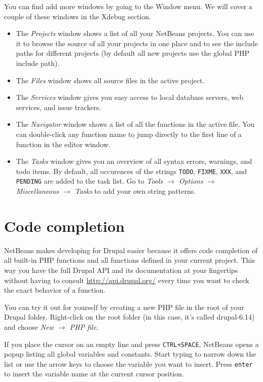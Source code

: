 \documentclass[draft,ebook,10pt,twoside,openright]{memoir}
\begin{document}
You can find add more windows by going to the Window menu. We will cover a couple of these windows in the Xdebug section.

\begin{itemize}
\item The \emph{Projects} window shows a list of all your NetBeans projects. You can use it to browse the source of all your projects in one place and to see the include paths for different projects (by default all new projects use the global PHP include path).
\item The \emph{Files} window shows all source files in the active project.
\item The \emph{Services} window gives you easy access to local database servers, web services, and issue trackers.
\item The \emph{Navigator} window shows a list of all the functions in the active file. You can double-click any function name to jump directly to the first line of a function in the editor window.
\item The \emph{Tasks} window gives you an overview of all syntax errors, warnings, and todo items. By default, all occurences of the strings \verb!TODO!, \verb!FIXME!, \verb!XXX!, and \verb!PENDING! are added to the task list. Go to \emph{Tools $\rightarrow$ Options $\rightarrow$ Miscellaneous $\rightarrow$ Tasks} to add your own string patterns.
\end{itemize}

\section{Code completion}

NetBeans makes developing for Drupal easier because it offers code completion of all built-in PHP functions and all functions defined in your current project. This way you have the full Drupal API and its documentation at your fingertips without having to consult \url{http://api.drupal.org/} every time you want to check the exact behavior of a function.

You can try it out for yourself by creating a new PHP file in the root of your Drupal folder. Right-click on the root folder (in this case, it’s called drupal-6.14) and choose \emph{New $\rightarrow$ PHP file}.

If you place the cursor on an empty line and press \verb!CTRL+SPACE!, NetBeans opens a popup listing all global variables and constants. Start typing to narrow down the list or use the arrow keys to choose the variable you want to insert. Press \verb!enter! to insert the variable name at the current cursor position.
\end{document}
